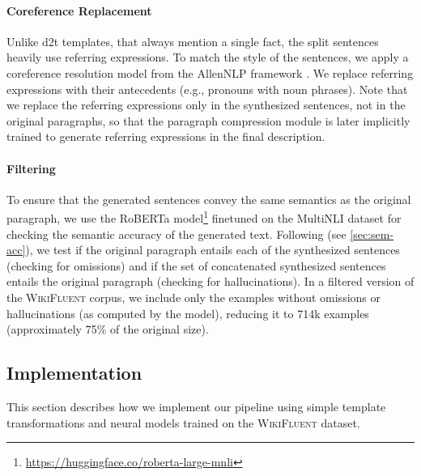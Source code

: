 


\paragraph{Coreference Replacement} Unlike \ac{d2t} templates, that always mention a single fact, the split sentences heavily use referring expressions. To match the style of the sentences, we apply a coreference resolution model \cite{Lee2018HigherorderCR} from the AllenNLP framework \cite{gardner2018allennlp}. We replace referring expressions with their antecedents (e.g., pronouns with noun phrases). Note that we replace the referring expressions only in the synthesized sentences, not in the original paragraphs, so that the paragraph compression module is later implicitly trained to generate referring expressions in the final description.

\paragraph{Filtering} To ensure that the generated sentences convey the same semantics as the original paragraph, we use the RoBERTa model\footnote{\url{https://huggingface.co/roberta-large-mnli}} \cite{liuRoBERTaRobustlyOptimized2019} finetuned on the MultiNLI dataset \cite{williams2018mnli} for checking the semantic accuracy of the generated text. Following \citet{dusekEvaluatingSemanticAccuracy2020} (see \autoref{sec:sem-acc}), we test if the original paragraph entails each of the synthesized sentences (checking for omissions) and if the set of concatenated synthesized sentences entails the original paragraph (checking for hallucinations). In a filtered version of the \textsc{WikiFluent} corpus, we include only the examples without omissions or hallucinations (as computed by the model), reducing it to 714k examples (approximately 75\% of the original size).

\subsection{Implementation}
\label{sec:pipeline:implementation}

This section describes how we implement our pipeline using simple template transformations and neural models trained on the \textsc{WikiFluent} dataset.

